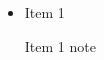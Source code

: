 \begin{frame}
  \frametitle{}
  \framesubtitle{}
  \begin{itemize}
    \item<1-> Item 1 

           {\scriptsize{Item 1 note}}

  \end{itemize}
\end{frame}
